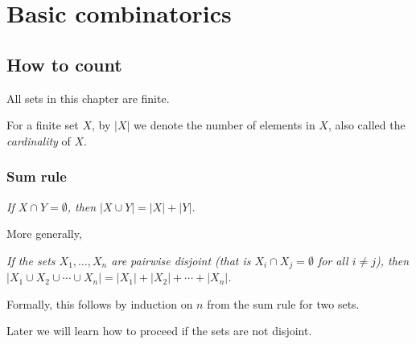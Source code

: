 


\begin{page}
\setcounter{section}{1}
\setcounter{subsection}{0}
\setcounter{dfn}{0}
\label{portion:1}

\chapter{Basic combinatorics}


\end{page}

\begin{page}
\setcounter{section}{1}
\setcounter{subsection}{1}
\setcounter{dfn}{0}
\label{portion:2}

\section{How to count}
All sets in this chapter are finite.

For a finite set $X$, by $|X|$ we denote the number of elements in $X$, also called the \emph{cardinality} of $X$.


\end{page}

\begin{page}
\setcounter{section}{1}
\setcounter{subsection}{2}
\setcounter{dfn}{0}
\label{portion:3}

\subsection{Sum rule}
\begin{center}
\emph{If $X \cap Y = \emptyset$, then $|X \cup Y| = |X| + |Y|$.}
\end{center}

More generally,
\begin{center}
\parbox{.9\textwidth}{\emph{If the sets $X_1, \ldots, X_n$ are pairwise disjoint
(that is $X_i \cap X_j = \emptyset$ for all $i \ne j$),
then $|X_1 \cup X_2 \cup \cdots \cup X_n| = |X_1| + |X_2| + \cdots + |X_n|$.}}
\end{center}
Formally, this follows by induction on $n$ from the sum rule for two sets.

Later we will learn how to proceed if the sets are not disjoint.


\end{page}

